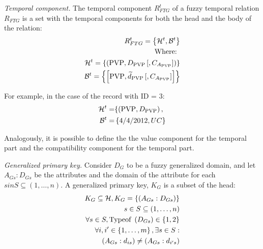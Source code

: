 \begin{definition}
\label{def:temporal-component}
\emph{Temporal component.}
The temporal component $R^{t}_{FTG}$ of a fuzzy temporal relation $R_{FTG}$ is a set with the temporal components for both the head and the body of the relation:
\begin{align}
\label{eq:temporal-component}
R^{t}_{FTG} = \left \lbrace \mathcal{H}^{t},\mathcal{B}^{t} \right \rbrace \\
\nonumber
\text{Where: } \\
\nonumber
\mathcal{H}^{t} = \left \lbrace \left( \text{PVP}, D_{\text{PVP}}\left[,C_{A_{\text{PVP}}} \right] \right) \right \rbrace \\
\nonumber
\mathcal{B}^ {t} = \left \lbrace  \left[ \text{PVP}, \widetilde{d}_{\text{PVP}} \left[,C_{A_{\text{PVP}}} \right] \right]  \right \rbrace 
\end{align}
\end{definition}

For example, in the case of the record with ID = 3:
\begin{align}
\nonumber
\mathcal{H}^{t} = & \lbrace \left( \text{PVP}, D_{\text{PVP}}\right),\\
\nonumber
\mathcal{B}^ {t} =& \left \lbrace 4/4/2012 , UC \right \rbrace 
\end{align}


Analogously, it is possible to define the the value component for the temporal part and the compatibility component for the temporal part. 

\begin{definition}
\label{def:generalized-primary-key}
\emph{Generalized primary key.}
Consider $D_G$ to be a fuzzy generalized domain, and let $A_{Gs}:D_{Gs}$ be the attributes and the domain of the attribute for each $s in S \subseteq \left(1, \ldots, n \right)$.
A generalized primary key, $K_G$ is a subset of the head:
\begin{align}
\label{eq:generalized-primary-key}
K_G \subseteq \mathcal{H}, K_G = \left \lbrace  \left(A_{Gs}:D_{Gs} \right) \right \rbrace \\
\nonumber
s\in S \subseteq \left(1, \ldots, n \right) \\
\nonumber
\forall s \in S, \text{Typeof } \left(D_{Gs} \right) \in \left \lbrace 1, 2 \right \rbrace \\
\nonumber
\forall i, i' \in \left \lbrace 1, \ldots, m\right \rbrace , \exists s \in S: \\
\nonumber
\left(A_{Gs}:d_{is} \right) \neq \left(A_{Gs}:d_{i's} \right)
\end{align}
\end{definition}

